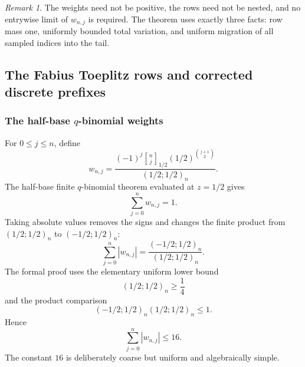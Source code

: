 \documentclass[11pt,oneside]{article}
\theoremstyle{definition}
\theoremstyle{remark}
\newtheorem{remark}[theorem]{Remark}
\newcommand{\qbinom}[3]{\genfrac{[}{]}{0pt}{}{#1}{#2}_{#3}}
\begin{document}
\begin{remark}
The weights need not be positive, the rows need not be nested, and no entrywise limit of
$w_{n,j}$ is required.  The theorem uses exactly three facts: row mass one, uniformly bounded
total variation, and uniform migration of all sampled indices into the tail.
\end{remark}

\subsection{The Fabius Toeplitz rows and corrected discrete prefixes}
\label{integration:sec:fabius-toeplitz}

\subsubsection{The half-base \texorpdfstring{$q$}{q}-binomial weights}

For $0\le j\le n$, define
\begin{equation}
 w_{n,j}=\frac{(-1)^j
 \qbinom{n}{j}{1/2}
 (1/2)^{\binom{j+1}{2}}}{(1/2;1/2)_n}.
 \label{integration:eq:fabius-toeplitz-weight}
\end{equation}
The half-base finite $q$-binomial theorem evaluated at $z=1/2$ gives
\begin{equation}
 \sum_{j=0}^{n}w_{n,j}=1.
 \label{integration:eq:fabius-toeplitz-mass}
\end{equation}
Taking absolute values removes the signs and changes the finite product from
$(1/2;1/2)_n$ to $(-1/2;1/2)_n$:
\begin{equation}
 \sum_{j=0}^{n}|w_{n,j}|
 =\frac{(-1/2;1/2)_n}{(1/2;1/2)_n}.
 \label{integration:eq:fabius-toeplitz-exact-variation}
\end{equation}
The formal proof uses the elementary uniform lower bound
\begin{equation}
 (1/2;1/2)_n\ge\frac14
 \label{integration:eq:half-q-lower-quarter}
\end{equation}
and the product comparison
\begin{equation}
 (-1/2;1/2)_n(1/2;1/2)_n\le1.
 \label{integration:eq:q-product-comparison}
\end{equation}
Hence
\begin{equation}
 \sum_{j=0}^{n}|w_{n,j}|\le16.
 \label{integration:eq:fabius-toeplitz-variation-16}
\end{equation}
The constant $16$ is deliberately coarse but uniform and algebraically simple.
\end{document}
